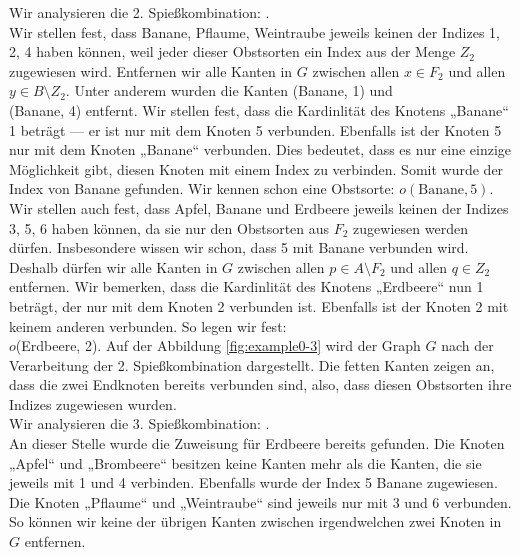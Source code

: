 Wir analysieren die 2. Spießkombination:
.\\
Wir stellen fest, dass Banane, Pflaume, Weintraube jeweils keinen der Indizes 1, 2, 4 haben können,
weil jeder dieser Obstsorten ein Index aus der Menge $Z_2$ zugewiesen wird. 
Entfernen wir alle Kanten in $G$ zwischen allen $x \in F_2$ und allen $y \in B \setminus Z_2$.
Unter anderem wurden die Kanten (Banane, 1) und\\ (Banane, 4) entfernt.
Wir stellen fest, dass die Kardinlität des Knotens „Banane“ 1 beträgt --- er ist nur mit dem Knoten 5 verbunden.
Ebenfalls ist der Knoten 5 nur mit dem Knoten „Banane“ verbunden.
Dies bedeutet, dass es nur eine einzige Möglichkeit gibt, diesen Knoten mit einem Index zu verbinden.
Somit wurde der Index von Banane gefunden. Wir kennen schon eine Obstsorte: $o(\text{Banane}, 5)$.\\
Wir stellen auch fest, dass Apfel, Banane und Erdbeere jeweils keinen der Indizes 3, 5, 6 haben können,
da sie nur den Obstsorten aus $F_2$ zugewiesen werden dürfen.
Insbesondere wissen wir schon, dass 5 mit Banane verbunden wird.
Deshalb dürfen wir alle Kanten in $G$ zwischen allen $p \in A \setminus F_2$ und allen $q \in Z_2$ entfernen.
Wir bemerken, dass die Kardinlität des Knotens „Erdbeere“ nun 1 beträgt, der nur mit dem Knoten 2 verbunden ist.
Ebenfalls ist der Knoten 2 mit keinem anderen verbunden. So legen wir fest:\\ $o$(Erdbeere, 2).
Auf der Abbildung \ref{fig:example0-3} wird der Graph $G$ nach der Verarbeitung der 2. Spießkombination
dargestellt. Die fetten Kanten zeigen an, dass die zwei Endknoten bereits verbunden sind, also, dass 
diesen Obstsorten ihre Indizes zugewiesen wurden.\\

Wir analysieren die 3. Spießkombination:
.\\
An dieser Stelle wurde die Zuweisung für Erdbeere bereits gefunden.
Die Knoten „Apfel“ und „Brombeere“ besitzen keine Kanten mehr als die Kanten, die sie jeweils mit 1 und 4 verbinden. 
Ebenfalls wurde der Index 5 Banane zugewiesen.
Die Knoten „Pflaume“ und „Weintraube“ sind jeweils nur mit 3 und 6 verbunden.
So können wir keine der übrigen Kanten zwischen irgendwelchen zwei Knoten in $G$ entfernen.\\

